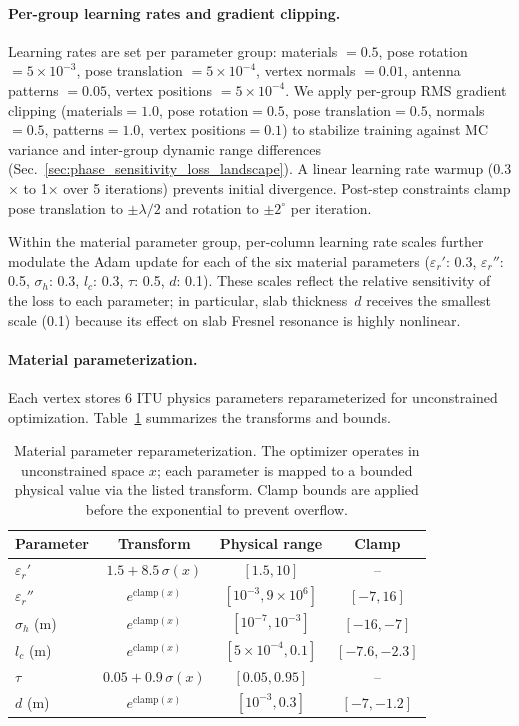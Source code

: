 \paragraph{Per-group learning rates and gradient clipping.}
Learning rates are set per parameter group: materials $= 0.5$, pose rotation $= 5 \times 10^{-3}$, pose translation $= 5 \times 10^{-4}$, vertex normals $= 0.01$, antenna patterns $= 0.05$, vertex positions $= 5 \times 10^{-4}$. We apply per-group RMS gradient clipping (materials$=1.0$, pose rotation$=0.5$, pose translation$=0.5$, normals$=0.5$, patterns$=1.0$, vertex positions$=0.1$) to stabilize training against MC variance and inter-group dynamic range differences (Sec.~\ref{sec:phase_sensitivity_loss_landscape}). A linear learning rate warmup (0.3$\times$ to 1$\times$ over 5 iterations) prevents initial divergence. Post-step constraints clamp pose translation to $\pm\lambda/2$ and rotation to $\pm 2^{\circ}$ per iteration.

Within the material parameter group, per-column learning rate scales further modulate the Adam update for each of the six material parameters ($\varepsilon_r'$: 0.3, $\varepsilon_r''$: 0.5, $\sigma_h$: 0.3, $l_c$: 0.3, $\tau$: 0.5, $d$: 0.1). These scales reflect the relative sensitivity of the loss to each parameter; in particular, slab thickness~$d$ receives the smallest scale (0.1) because its effect on slab Fresnel resonance is highly nonlinear.

\paragraph{Material parameterization.}
Each vertex stores 6 ITU physics parameters reparameterized for unconstrained optimization. Table~\ref{tab:material_reparam} summarizes the transforms and bounds.

\begin{table}[ht!]
\centering
\caption{Material parameter reparameterization. The optimizer operates in unconstrained space $x$; each parameter is mapped to a bounded physical value via the listed transform. Clamp bounds are applied before the exponential to prevent overflow.}
\label{tab:material_reparam}
\begin{tabular}{lccc}
\toprule
\textbf{Parameter} & \textbf{Transform} & \textbf{Physical range} & \textbf{Clamp} \\
\midrule
$\varepsilon_r'$ & $1.5 + 8.5\,\sigma(x)$ & $[1.5, 10]$ & -- \\
$\varepsilon_r''$ & $e^{\text{clamp}(x)}$ & $[10^{-3}, 9{\times}10^{6}]$ & $[-7, 16]$ \\
$\sigma_h$ (m) & $e^{\text{clamp}(x)}$ & $[10^{-7}, 10^{-3}]$ & $[-16, -7]$ \\
$l_c$ (m) & $e^{\text{clamp}(x)}$ & $[5{\times}10^{-4}, 0.1]$ & $[-7.6, -2.3]$ \\
$\tau$ & $0.05 + 0.9\,\sigma(x)$ & $[0.05, 0.95]$ & -- \\
$d$ (m) & $e^{\text{clamp}(x)}$ & $[10^{-3}, 0.3]$ & $[-7, -1.2]$ \\
\bottomrule
\end{tabular}
\end{table}

